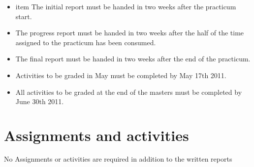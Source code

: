 \documentclass[a4paper]{article}
\begin{document}
\begin{itemize}
  \item item The initial report must be handed in two weeks after the practicum start.
  \item The progress report must be handed in two weeks after the half of the time assigned to the practicum has been consumed.
  \item The final report must be handed in two weeks after the end of the practicum.
  \item Activities to be graded in May must be completed by May 17th 2011.
  \item All activities to be graded at the end of the masters must be completed by June 30th 2011.
\end{itemize}

\section{Assignments and activities}

 No Assignments or activities are required in addition to the written reports
\end{document}
